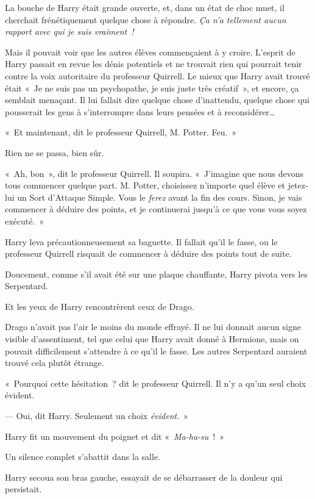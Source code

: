 La bouche de Harry était grande ouverte, et, dans un état de choc muet, il cherchait frénétiquement quelque chose à répondre. \emph{Ça n'a tellement aucun rapport avec qui je suis vraiment~!}

Mais il pouvait voir que les autres élèves commençaient à y croire. L'esprit de Harry passait en revue les dénis potentiels et ne trouvait rien qui pourrait tenir contre la voix autoritaire du professeur Quirrell. Le mieux que Harry avait trouvé était «~Je ne suis pas un psychopathe, je suis juste très créatif~», et encore, ça semblait menaçant. Il lui fallait dire quelque chose d'inattendu, quelque chose qui pousserait les gens à s'interrompre dans leurs pensées et à reconsidérer…

«~Et maintenant, dit le professeur Quirrell, M. Potter. Feu.~»

Rien ne se passa, bien sûr.

«~Ah, bon~», dit le professeur Quirrell. Il soupira. «~J'imagine que nous devons tous commencer quelque part. M. Potter, choisissez n'importe quel élève et jetez-lui un Sort d'Attaque Simple. Vous le \emph{ferez} avant la fin des cours. Sinon, je vais commencer à déduire des points, et je continuerai jusqu'à ce que vous vous soyez exécuté.~»

Harry leva précautionneusement sa baguette. Il fallait qu'il le fasse, ou le professeur Quirrell risquait de commencer à déduire des points tout de suite.

Doucement, comme s'il avait été sur une plaque chauffante, Harry pivota vers les Serpentard.

Et les yeux de Harry rencontrèrent ceux de Drago.

Drago n'avait pas l'air le moins du monde effrayé. Il ne lui donnait aucun signe visible d'assentiment, tel que celui que Harry avait donné à Hermione, mais on pouvait difficilement s'attendre à ce qu'il le fasse. Les autres Serpentard auraient trouvé cela plutôt étrange.

«~Pourquoi cette hésitation~? dit le professeur Quirrell. Il n'y a qu'un seul choix évident.

--- Oui, dit Harry. Seulement un choix \emph{évident}.~»

Harry fit un mouvement du poignet et dit «~\emph{Ma-ha-su}~!~»

Un silence complet s'abattit dans la salle.

Harry secoua son bras gauche, essayait de se débarrasser de la douleur qui persistait.

